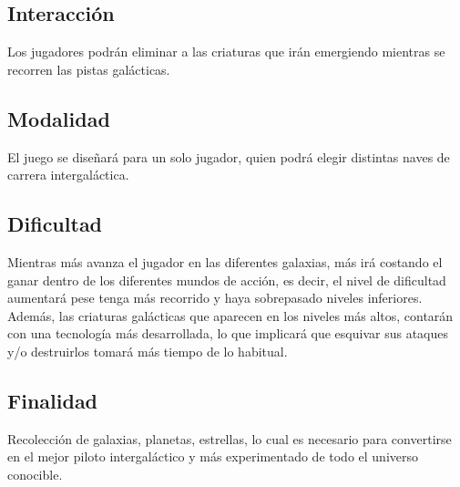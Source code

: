 \documentclass{article}
\begin{document}
\subsection{Interacción}
Los jugadores podrán eliminar a las criaturas que irán emergiendo mientras se recorren las pistas galácticas.

\subsection{Modalidad}
El juego se diseñará para un solo jugador, quien podrá elegir distintas naves de carrera intergaláctica.

\subsection{Dificultad}
Mientras más avanza el jugador en las diferentes galaxias, más irá costando el ganar dentro de los diferentes mundos de acción, es decir, el nivel de dificultad aumentará pese tenga más recorrido y haya sobrepasado niveles inferiores. Además, las criaturas galácticas que aparecen en los niveles más altos, contarán con una tecnología más desarrollada, lo que implicará que esquivar sus ataques y/o destruirlos tomará más tiempo de lo habitual. 

\subsection{Finalidad}
Recolección de galaxias, planetas, estrellas, lo cual es necesario para convertirse en el mejor piloto intergaláctico y más experimentado de todo el universo conocible. 
\newpage



\cite{calistenia}
\end{document}
